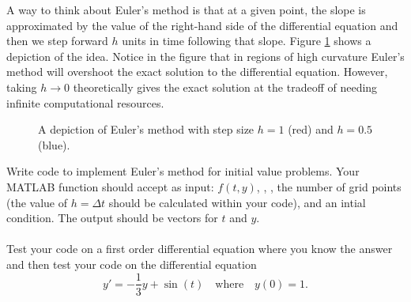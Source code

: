 A way to think about Euler's method is that at a given point, the slope is approximated by
the value of the right-hand side of the differential equation and then we step forward $h$
units in time following that slope.  Figure \ref{fig:Euler} shows a depiction of the idea.
Notice in the figure that in regions of high curvature Euler's method will overshoot the
exact solution to the differential equation.  However, taking $h \to 0$ theoretically
gives the exact solution at the tradeoff of needing infinite computational resources.

\begin{figure}[ht!]
    \begin{center}
    \end{center}
    \caption{A depiction of Euler's method with step size $h=1$ (red) and $h=0.5$ (blue).}
    \label{fig:Euler}
\end{figure}


\begin{problem}
    Write code to implement Euler's method for initial value problems.  Your MATLAB
    function should accept as input: $f(t,y)$, , , the number of
    grid points (the value of $h = \Delta t$ should be calculated within your code), and
    an intial condition.  The output should be vectors for $t$ and $y$.\\
     \\
    Test your code on a first order differential equation where you know the answer and
    then test your code on the differential equation
    \[ y' = -\frac{1}{3}y+\sin(t) \quad \text{where} \quad y(0) = 1. \]
\end{problem}

